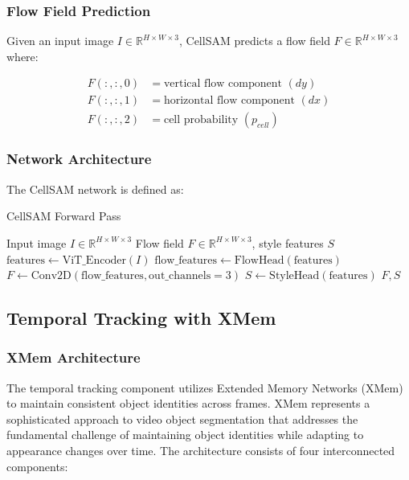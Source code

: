 \documentclass[12pt]{article}
\begin{document}
\subsubsection{Flow Field Prediction}


Given an input image $I \in \mathbb{R}^{H \times W \times 3}$, CellSAM predicts a flow field $F \in \mathbb{R}^{H \times W \times 3}$ where:

\begin{align}
  F(:,:,0) & = \text{vertical flow component } (dy)   \\
  F(:,:,1) & = \text{horizontal flow component } (dx) \\
  F(:,:,2) & = \text{cell probability } (p_{cell})
\end{align}

\subsubsection{Network Architecture}

The CellSAM network is defined as:

\begin{algorithm}[H]
  \caption{CellSAM Forward Pass}
  \begin{algorithmic}[1]
    \REQUIRE Input image $I \in \mathbb{R}^{H \times W \times 3}$
    \ENSURE Flow field $F \in \mathbb{R}^{H \times W \times 3}$, style features $S$
    \STATE $\text{features} \leftarrow \text{ViT\_Encoder}(I)$
    \STATE $\text{flow\_features} \leftarrow \text{FlowHead}(\text{features})$
    \STATE $F \leftarrow \text{Conv2D}(\text{flow\_features}, \text{out\_channels}=3)$
    \STATE $S \leftarrow \text{StyleHead}(\text{features})$
    \RETURN $F, S$
  \end{algorithmic}
\end{algorithm}

\subsection{Temporal Tracking with XMem}

\subsubsection{XMem Architecture}

The temporal tracking component utilizes Extended Memory Networks (XMem) to maintain consistent object identities across frames. XMem represents a sophisticated approach to video object segmentation that addresses the fundamental challenge of maintaining object identities while adapting to appearance changes over time. The architecture consists of four interconnected components:
\end{document}
